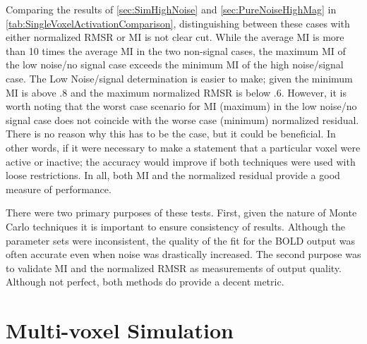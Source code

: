 Comparing the results of \autoref{sec:SimHighNoise} and 
\autoref{sec:PureNoiseHighMag}
in \autoref{tab:SingleVoxelActivationComparison},
distinguishing between these cases with either normalized \ac{RMSR} or 
\ac{MI} is not clear cut. While the average \ac{MI}
is more than 10 times
the average \ac{MI} in the two non-signal cases, the maximum
\ac{MI} of the low noise/no signal case exceeds the minimum \ac{MI}
of the high noise/signal
case. The Low Noise/signal determination is easier to make; given
the minimum \ac{MI} is above $.8$ and the maximum normalized 
\ac{RMSR} is below $.6$.
However, it is worth noting that the worst case scenario  for \ac{MI} (maximum) in the
low noise/no signal case does not coincide with the worse case (minimum) normalized residual.
There is no reason why this has to be the case, but it could be beneficial. In
other words, if it were necessary to make a statement that
a particular voxel were active or inactive; the accuracy would improve if both techniques
were used with loose restrictions. In all, both \ac{MI} and the normalized residual
provide a good measure of performance.

There were two primary purposes of these tests. First, given the nature of Monte Carlo
techniques it is important to ensure consistency of results. Although the parameter
sets were inconsistent, the quality of the fit for the \ac{BOLD} output was often
accurate even when noise was drastically increased. The second purpose was to validate
\ac{MI} and the normalized \ac{RMSR} as measurements of output quality.
Although not perfect, both methods do provide a decent metric.

\section{Multi-voxel Simulation}
\label{sec:Multi-voxel Simulation}

